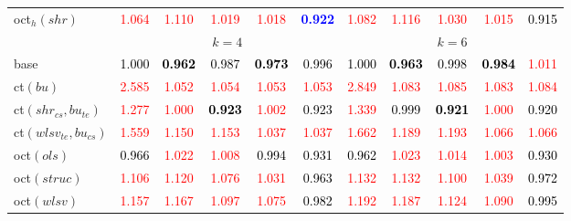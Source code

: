 \begin{tabular}[t]{l|>{}cccc>{}c|ccccc}
oct$_h(shr)$ & \textcolor{red}{1.064} & \textcolor{red}{1.110} & \textcolor{red}{1.019} & \textcolor{red}{1.018} & \textcolor{blue}{\textbf{0.922}} & \textcolor{red}{1.082} & \textcolor{red}{1.116} & \textcolor{red}{1.030} & \textcolor{red}{1.015} & \textcolor{black}{0.915}\\
\addlinespace[0.3em]
\multicolumn{1}{c}{} & \multicolumn{5}{c}{\textbf{$k = 4$}} & \multicolumn{5}{c}{\textbf{$k = 6$}}\\
base & \textcolor{black}{1.000} & \textcolor{black}{\textbf{0.962}} & \textcolor{black}{0.987} & \textcolor{black}{\textbf{0.973}} & \textcolor{black}{0.996} & \textcolor{black}{1.000} & \textcolor{black}{\textbf{0.963}} & \textcolor{black}{0.998} & \textcolor{black}{\textbf{0.984}} & \textcolor{red}{1.011}\\
ct$(bu)$ & \textcolor{red}{2.585} & \textcolor{red}{1.052} & \textcolor{red}{1.054} & \textcolor{red}{1.053} & \textcolor{red}{1.053} & \textcolor{red}{2.849} & \textcolor{red}{1.083} & \textcolor{red}{1.085} & \textcolor{red}{1.083} & \textcolor{red}{1.084}\\
ct$(shr_{cs}, bu_{te})$ & \textcolor{red}{1.277} & \textcolor{red}{1.000} & \textcolor{black}{\textbf{0.923}} & \textcolor{red}{1.002} & \textcolor{black}{0.923} & \textcolor{red}{1.339} & \textcolor{black}{0.999} & \textcolor{black}{\textbf{0.921}} & \textcolor{red}{1.000} & \textcolor{black}{0.920}\\
ct$(wlsv_{te}, bu_{cs})$ & \textcolor{red}{1.559} & \textcolor{red}{1.150} & \textcolor{red}{1.153} & \textcolor{red}{1.037} & \textcolor{red}{1.037} & \textcolor{red}{1.662} & \textcolor{red}{1.189} & \textcolor{red}{1.193} & \textcolor{red}{1.066} & \textcolor{red}{1.066}\\
oct$(ols)$ & \textcolor{black}{0.966} & \textcolor{red}{1.022} & \textcolor{red}{1.008} & \textcolor{black}{0.994} & \textcolor{black}{0.931} & \textcolor{black}{0.962} & \textcolor{red}{1.023} & \textcolor{red}{1.014} & \textcolor{red}{1.003} & \textcolor{black}{0.930}\\
oct$(struc)$ & \textcolor{red}{1.106} & \textcolor{red}{1.120} & \textcolor{red}{1.076} & \textcolor{red}{1.031} & \textcolor{black}{0.963} & \textcolor{red}{1.132} & \textcolor{red}{1.132} & \textcolor{red}{1.100} & \textcolor{red}{1.039} & \textcolor{black}{0.972}\\
oct$(wlsv)$ & \textcolor{red}{1.157} & \textcolor{red}{1.167} & \textcolor{red}{1.097} & \textcolor{red}{1.075} & \textcolor{black}{0.982} & \textcolor{red}{1.192} & \textcolor{red}{1.187} & \textcolor{red}{1.124} & \textcolor{red}{1.090} & \textcolor{black}{0.995}\\

\end{tabular}
